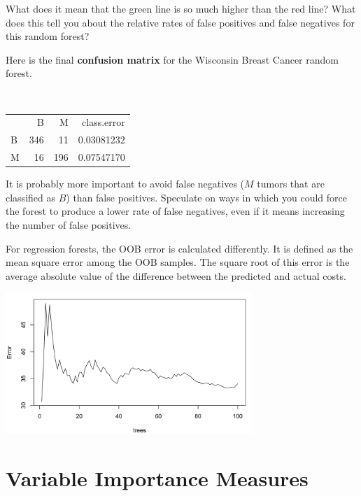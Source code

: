 \vspace{4mm}

\begin{question}{}
What does it mean that the green line is so much higher than the red line? What does this tell you about the relative rates of false positives and false negatives for this random forest?
\end{question}

\begin{question}{}
Here is the final \textbf{confusion matrix} for the Wisconsin Breast Cancer random forest. 
\vspace{-3mm}
\begin{center}
{\tt
\begin{tabular}{lrrr}
&    B  &  M  & class.error \\
B & 346 & 11 & 0.03081232 \\
M & 16 & 196 & 0.07547170 
\end{tabular}
}
\end{center}
\vspace{-3mm}
It is probably more important to avoid false negatives ($M$ tumors that are classified as $B$) than false positives. Speculate on ways in which you could force the forest to produce a lower rate of false negatives, even if it means increasing the number of false positives. 
\end{question}

For regression forests, the OOB error is calculated differently. It is defined as the mean square error among the OOB samples. The square root of this error is the average absolute value of the difference between the predicted and actual costs. 
\begin{center}
\includegraphics[width=0.7\textwidth]{img/oob-classification-insur.png}
\end{center}


\section{Variable Importance Measures}

